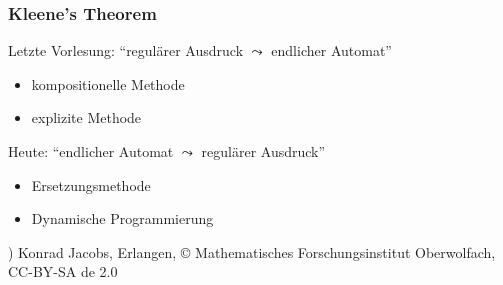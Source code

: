 \documentclass[onlymath]{beamer}
\begin{document}
\begin{frame}\frametitle{Kleene's Theorem}

\medskip

Letzte Vorlesung: "`regulärer Ausdruck $\leadsto$ endlicher Automat"'
\begin{itemize}
\item kompositionelle Methode
\item explizite Methode
\end{itemize}
\bigskip

Heute: "`endlicher Automat $\leadsto$ regulärer Ausdruck"'
\begin{itemize}
\item Ersetzungsmethode
\item Dynamische Programmierung
\end{itemize}


\hspace{8.1cm}

{\tiny *) Konrad Jacobs, Erlangen, \copyright{} Mathematisches Forschungsinstitut Oberwolfach, CC-BY-SA de 2.0}


\end{frame}

\end{document}
